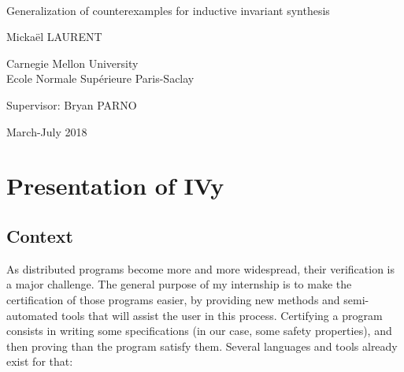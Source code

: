 \documentclass[11pt,a4paper,oldfontcommands,openany]{memoir}
\begin{document}
%
%
\thispagestyle{empty}

{%
\sffamily
\centering
\Large

~\vspace{\fill}

{\huge 
Generalization of counterexamples for inductive invariant synthesis
}

\vspace{2.5cm}

{\LARGE
Mickaël LAURENT
}

\vspace{3.5cm}

Carnegie Mellon University\\
Ecole Normale Supérieure Paris-Saclay

\vspace{3.5cm}

Supervisor: Bryan PARNO

\vspace{\fill}

March-July 2018

}%

\clearpage%

\tableofcontents*

\clearpage

\setcounter{page}{1}
\chapter{Presentation of IVy}

    \section{Context}

    As distributed programs become more and more widespread, their verification is a major challenge.
    The general purpose of my internship is to make the certification of those programs easier, by providing new methods and semi-automated tools that will assist the user in this process.
    Certifying a program consists in writing some specifications (in our case, some safety properties), and then proving than the program satisfy them.
    Several languages and tools already exist for that:
\end{document}
